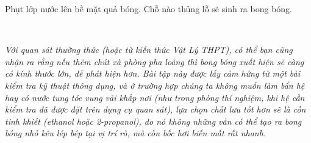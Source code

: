 Phụt lớp nước lên bề mặt quả bóng. Chỗ nào thủng lỗ sẽ sinh ra bong bóng. 

\ \ 

\textit{Với quan sát thường thức (hoặc từ kiến thức Vật Lý THPT), có thể bạn cũng nhận ra rằng nếu thêm chút xà phòng pha loãng thì bong bóng xuất hiện sẽ càng có kính thước lớn, dễ phát hiện hơn. Bài tập này được lấy cảm hứng từ một bài kiểm tra kỹ thuật thông dụng, và ở trường hợp chúng ta không muốn làm bẩn hệ hay có nước tung tóe vung vãi khắp nơi (như trong phòng thí nghiệm, khi hệ cần kiểm tra đã được đặt trên dụng cụ quan sát), lựa chọn chất lưu tốt hơn sẽ là cồn tinh khiết (ethanol hoặc 2-propanol), do nó không những vẫn có thể tạo ra bong bóng nhỏ kêu lép bép tại vị trí rò, mà còn bốc hơi biến mất rất nhanh.}